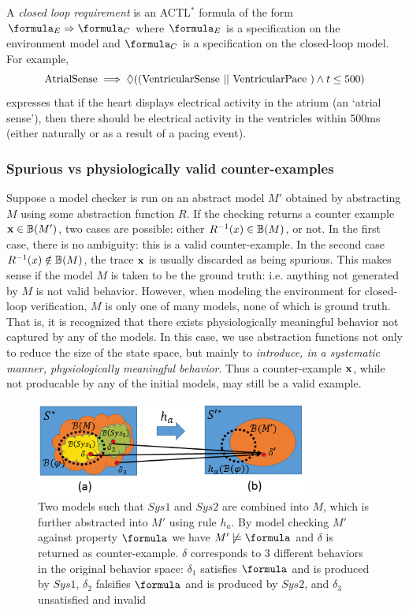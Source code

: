 A \emph{closed loop requirement} is an ACTL$^*$ formula of the form$\formula_E\Rightarrow \formula_C$ where $\formula_E$ is a specification on the environment model and $\formula_C$ is a specification on the closed-loop model.
For example, 
\[\textrm{AtrialSense} \implies \Diamond ((\textrm{VentricularSense } ||  \textrm{ VentricularPace }) \wedge  t \leq 500)\]
 expresses that if the heart displays electrical activity in the atrium (an `atrial sense'), then there should be electrical activity in the ventricles within 500ms (either naturally or as a result of a pacing event).

\subsubsection{Spurious vs physiologically valid counter-examples}
Suppose a model checker is run on an abstract model $M'$ obtained by abstracting $M$ using some abstraction function $R$.
If the checking returns a counter example $\mathbf{x} \in \mathbb{B}(M')$, two cases are possible:
either $R^{-1}(x) \in \mathbb{B}(M)$, or not.
In the first case, there is no ambiguity: this is a valid counter-example.
In the second case $R^{-1}(x) \notin \mathbb{B}(M)$, the trace $\mathbf{x}$ is usually discarded as being spurious.
This makes sense if the model $M$ is taken to be the ground truth: i.e. anything not generated by $M$ is not valid behavior. 
However, when modeling the environment for closed-loop verification, $M$ is only one of many models, none of which is ground truth. 
That is, it is recognized that there exists physiologically meaningful behavior not captured by any of the models. 
In this case, we use abstraction functions not only to reduce the size of the state space, but mainly to \emph{introduce, in a systematic manner, physiologically meaningful behavior}. 
Thus a counter-example $\mathbf{x}$, while not producable by any of the initial models, may still be a valid example.

\begin{figure}[!t]
		\centering
		\includegraphics[width=0.8\textwidth]{figs/distinction.png}
		\caption{\small Two models such that $Sys1$ and $Sys2$ are combined into $M$, which is further abstracted into $M'$ using rule $h_a$. By model checking $M'$ against property $\formula$ we have $M'\not\models\formula$ and $\delta$ is returned as counter-example. $\delta$ corresponds to 3 different behaviors in the original behavior space: $\delta_1$ satisfies $\formula$ and is produced by $Sys1$, $\delta_2$ falsifies $\formula$ and is produced by $Sys2$, and $\delta_3$ unsatisfied and invalid}
		\label{fig:ambiguity}
\end{figure}

